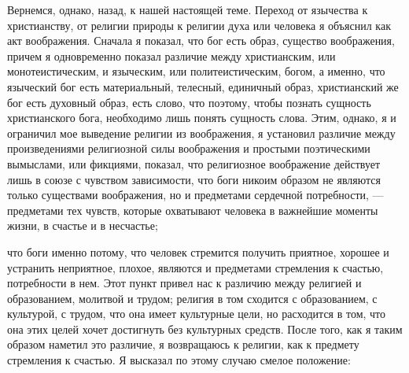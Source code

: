 \documentclass[12pt]{article}
\begin{document}
Вернемся, однако, назад, к нашей настоящей теме. Переход от язычества к христианству, от религии природы к религии духа или человека я объяснил как акт воображения. Сначала я показал, что бог есть образ, существо воображения, причем я одновременно показал различие между христианским, или монотеистическим, и языческим, или политеистическим, богом, а именно, что языческий бог есть материальный, телесный, единичный образ, христианский же бог есть духовный образ, есть слово, что поэтому, чтобы познать сущность христианского бога, необходимо лишь понять сущность слова. Этим, однако, я и ограничил мое выведение религии из воображения, я установил различие между произведениями религиозной силы воображения и простыми поэтическими вымыслами, или фикциями, показал, что религиозное воображение действует лишь в союзе с чувством зависимости, что боги никоим образом не являются только существами воображения, но и предметами сердечной потребности, --- предметами тех чувств, которые охватывают человека в важнейшие моменты жизни, в счастье и в несчастье; 

что боги именно потому, что человек стремится получить приятное, хорошее и устранить неприятное, плохое, являются и предметами стремления к счастью, потребности в нем. Этот пункт привел нас к различию между религией и образованием, молитвой и трудом; религия в том сходится с образованием, с культурой, с трудом, что она имеет культурные цели, но расходится в том, что она этих целей хочет достигнуть без культурных средств. После того, как я таким образом наметил это различие, я возвращаюсь к религии, как к предмету стремления к счастью. Я высказал по этому случаю смелое положение: 
\end{document}
